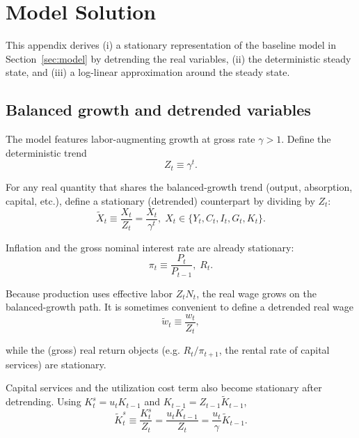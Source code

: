 
\section{Model Solution}
\label{app:model}

This appendix derives (i) a stationary representation of the baseline model in Section~\ref{sec:model} by detrending the real variables, (ii) the deterministic steady state, and (iii) a log-linear approximation around the steady state.

\subsection{Balanced growth and detrended variables}
\label{app:detrending}

The model features labor-augmenting growth at gross rate $\gamma>1$. Define the deterministic trend
\begin{equation}
	Z_t \equiv \gamma^t.
\end{equation}

For any real quantity that shares the balanced-growth trend (output, absorption, capital, etc.), define a stationary (detrended) counterpart by dividing by $Z_t$:
\begin{equation}
	\tilde X_t \equiv \frac{X_t}{Z_t} = \frac{X_t}{\gamma^t},
	\; X_t\in\{Y_t, C_t, I_t, G_t, K_t\}.
\end{equation}

Inflation and the gross nominal interest rate are already stationary:
\begin{equation}
	\pi_t \equiv \frac{P_t}{P_{t-1}},\; R_t.
\end{equation}

Because production uses effective labor $Z_t N_t$, the real wage grows on the balanced-growth path. It is sometimes convenient to define a detrended real wage
\begin{equation}
	\tilde w_t \equiv \frac{w_t}{Z_t},
\end{equation}

while the (gross) real return objects (e.g. $R_t/\pi_{t+1}$, the rental rate of capital services) are stationary.

Capital services and the utilization cost term also become stationary after detrending. Using $K_t^s=u_t K_{t-1}$ and $K_{t-1}=Z_{t-1}\tilde K_{t-1}$,
\begin{equation}
	\tilde K_t^s \equiv \frac{K_t^s}{Z_t} = \frac{u_t K_{t-1}}{Z_t} = \frac{u_t}{\gamma}\tilde K_{t-1}.
\end{equation}

